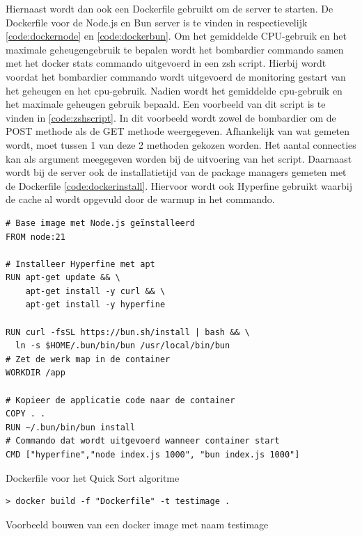 Hiernaast wordt dan ook een Dockerfile gebruikt om de server te starten. De Dockerfile voor de Node.js en Bun server is te vinden in
respectievelijk \ref{code:dockernode} en \ref{code:dockerbun}. 
Om het gemiddelde CPU-gebruik en het maximale geheugengebruik te bepalen wordt het bombardier commando samen met het docker stats commando uitgevoerd in een zsh script.
Hierbij wordt voordat het bombardier commando wordt uitgevoerd de monitoring gestart van het geheugen en het cpu-gebruik. Nadien wordt het gemiddelde cpu-gebruik en het maximale geheugen gebruik bepaald.
Een voorbeeld van dit script  is te vinden in \ref{code:zshscript}. 
In dit voorbeeld wordt zowel de bombardier om de POST methode als de GET methode weergegeven. Afhankelijk van wat gemeten wordt, moet tussen 1 van deze 2 methoden gekozen worden.
Het aantal connecties kan als argument meegegeven worden bij de uitvoering van het script.
Daarnaast wordt bij de server ook de installatietijd van de package managers gemeten met de Dockerfile \ref{code:dockerinstall}.
Hiervoor wordt ook Hyperfine gebruikt waarbij de cache al wordt opgevuld door de warmup in het commando.
\begin{listing}[H]
  \centering
  \begin{verbatim}
# Base image met Node.js geïnstalleerd
FROM node:21

# Installeer Hyperfine met apt
RUN apt-get update && \
    apt-get install -y curl && \
    apt-get install -y hyperfine

RUN curl -fsSL https://bun.sh/install | bash && \
  ln -s $HOME/.bun/bin/bun /usr/local/bin/bun
# Zet de werk map in de container
WORKDIR /app

# Kopieer de applicatie code naar de container
COPY . .
RUN ~/.bun/bin/bun install
# Commando dat wordt uitgevoerd wanneer container start
CMD ["hyperfine","node index.js 1000", "bun index.js 1000"]
      \end{verbatim}
      \caption{\label{code:dockerscript}Dockerfile voor het Quick Sort algoritme}
\end{listing}
\begin{listing}[H]
  \centering
  \begin{verbatim}
> docker build -f "Dockerfile" -t testimage .
      \end{verbatim}
      \caption{\label{code:dockerbuild}Voorbeeld bouwen van een docker image met naam testimage}
\end{listing}
